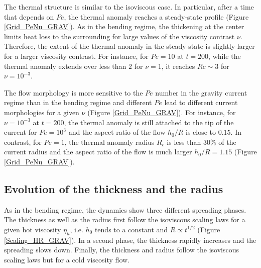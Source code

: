 The  thermal  structure  is  similar   to  the  isoviscous  case.   In
particular, after  a time  that depends on  $Pe$, the  thermal anomaly
reaches a  steady-state profile (Figure \ref{Grid_PeNu_GRAV}).   As in
the bending regime,  the thickening at the center limits  heat loss to
the  surrounding for  large values  of the  viscosity contrast  $\nu$.
Therefore, the  extent of the  thermal anomaly in the  steady-state is
slightly larger  for a larger  viscosity contrast.  For  instance, for
$Pe=10$ at $t=200$,  while the thermal anomaly extends  over less than
$2$ for $\nu=1$, it reaches $Rc\sim3$ for $\nu=10^{-3}$.

The  flow morphology  is  more sensitive  to the  $Pe$  number in  the
gravity current regime  than in the bending regime  and different $Pe$
lead  to different  current  morphologies for  a  given $\nu$  (Figure
\ref{Grid_PeNu_GRAV}).   For instance,  for $\nu=10^{-3}$  at $t=200$,
the thermal  anomaly is still attached  to the tip of  the current for
$Pe =  10^3$ and  the aspect  ratio of  the flow  $h_0/R$ is  close to
$0.15$.  In contrast, for $Pe=1$,  the thermal anomaly radius $R_c$ is
less than  $30\%$ of the  current radius and  the aspect ratio  of the
flow is much larger $h_0/R = 1.15$ (Figure \ref{Grid_PeNu_GRAV}).

\subsection{Evolution of the thickness and the radius}
\label{sec:evol-thickn-radi-g}
  
As in the bending regime,  the dynamics show three different spreading
phases.   The  thickness  as  well  as the  radius  first  follow  the
isoviscous  scaling laws  for  a given  hot  viscosity $\eta_h$,  i.e.
$h_0$   tends   to  a   constant   and   $R\propto  t^{1/2}$   (Figure
\ref{Scaling_HR_GRAV}).   In a  second  phase,  the thickness  rapidly
increases and  the spreading slows  down.  Finally, the  thickness and
radius follow  the isoviscous  scaling laws but  for a  cold viscosity
flow.

